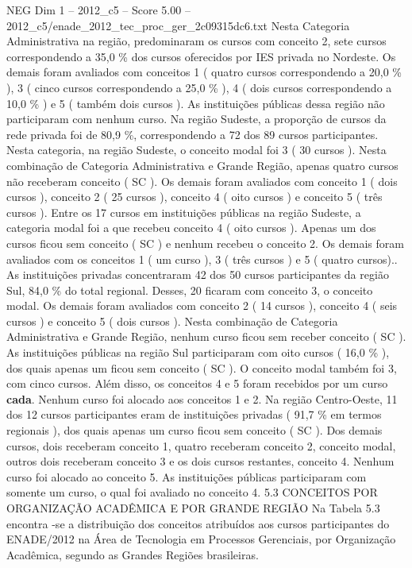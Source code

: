 \begin{textsample}{NEG Dim 1 – 2012\_c5 – Score 5.00 – 2012\_c5/enade\_2012\_tec\_proc\_ger\_2c09315dc6.txt}
Nesta Categoria Administrativa na região, predominaram os cursos com conceito 2, sete cursos correspondendo a 35,0 \% dos cursos oferecidos por IES privada no Nordeste.
Os demais foram avaliados com conceitos 1 ( quatro cursos correspondendo a 20,0 \% ), 3 ( cinco cursos correspondendo a 25,0 \% ), 4 ( dois cursos correspondendo a 10,0 \% ) e 5 ( também dois cursos ).
As instituições públicas dessa região não participaram com nenhum curso.
Na região Sudeste, a proporção de cursos da rede privada foi de 80,9 \%, correspondendo a 72 dos 89 cursos participantes.
Nesta categoria, na região Sudeste, o conceito modal foi 3 ( 30 cursos ).
Nesta combinação de Categoria Administrativa e Grande Região, apenas quatro cursos não receberam conceito ( SC ).
Os demais foram avaliados com conceito 1 ( dois cursos ), conceito 2 ( 25 cursos ), conceito 4 ( oito cursos ) e conceito 5 ( três cursos ).
Entre os 17 cursos em instituições públicas na região Sudeste, a categoria modal foi a que recebeu conceito 4 ( oito cursos ).
Apenas um dos cursos ficou sem conceito ( SC ) e nenhum recebeu o conceito 2.
Os demais foram avaliados com os conceitos 1 ( um curso ), 3 ( três cursos ) e 5 ( quatro cursos)..
As instituições privadas concentraram 42 dos 50 cursos participantes da região Sul, 84,0 \% do total regional.
Desses, 20 ficaram com conceito 3, o conceito modal.
Os demais foram avaliados com conceito 2 ( 14 cursos ), conceito 4 ( seis cursos ) e conceito 5 ( dois cursos ).
Nesta combinação de Categoria Administrativa e Grande Região, nenhum curso ficou sem receber conceito ( SC ).
As instituições públicas na região Sul participaram com oito cursos ( 16,0 \% ), dos quais apenas um ficou sem conceito ( SC ).
O conceito modal também foi 3, com cinco cursos.
Além disso, os conceitos 4 e 5 foram recebidos por um curso \textbf{cada}.
Nenhum curso foi alocado aos conceitos 1 e 2.
Na região Centro-Oeste, 11 dos 12 cursos participantes eram de instituições privadas ( 91,7 \% em termos regionais ), dos quais apenas um curso ficou sem conceito ( SC ).
Dos demais cursos, dois receberam conceito 1, quatro receberam conceito 2, conceito modal, outros dois receberam conceito 3 e os dois cursos restantes, conceito 4.
Nenhum curso foi alocado ao conceito 5.
As instituições públicas participaram com somente um curso, o qual foi avaliado no conceito 4. 5.3 CONCEITOS POR ORGANIZAÇÃO ACADÊMICA E POR GRANDE REGIÃO Na Tabela 5.3 encontra -se a distribuição dos conceitos atribuídos aos cursos participantes do ENADE/2012 na Área de Tecnologia em Processos Gerenciais, por Organização Acadêmica, segundo as Grandes Regiões brasileiras.

\end{textsample}
